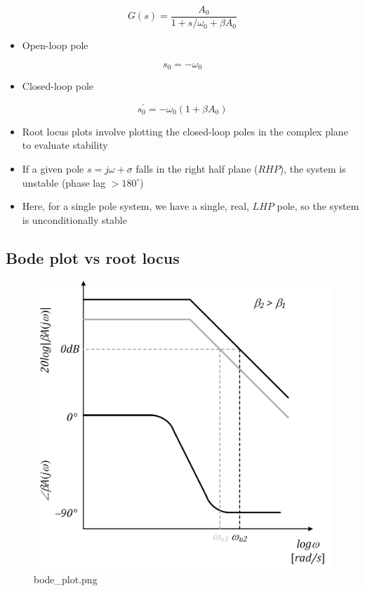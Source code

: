 \documentclass[11pt]{article}
\providecommand{\tightlist}{%
      \setlength{\itemsep}{0pt}\setlength{\parskip}{0pt}}
\begin{document}
\begin{equation}
G(s) = \dfrac{A_0}{1+s/\omega_0 + \beta A_0}
\end{equation}

    \begin{itemize}
\tightlist
\item
  Open-loop pole
\end{itemize}

\begin{equation}
s_0 = -\omega_0
\end{equation}

\begin{itemize}
\tightlist
\item
  Closed-loop pole
\end{itemize}

\begin{equation}
s_0^{'} = -\omega_0(1+\beta A_0)
\end{equation}

    \begin{itemize}
\item
  Root locus plots involve plotting the closed-loop poles in the complex
  plane to evaluate stability
\item
  If a given pole \(s = j\omega + \sigma\) falls in the right half plane
  (\(RHP\)), the system is unstable (phase lag \(> 180^{\circ}\))
\item
  Here, for a single pole system, we have a single, real, \(LHP\) pole,
  so the system is unconditionally stable
\end{itemize}

    \hypertarget{bode-plot-vs-root-locus}{%
\subsection{Bode plot vs root locus}\label{bode-plot-vs-root-locus}}

    \begin{figure}
\centering
\includegraphics{bode_plot.png}
\caption{bode\_plot.png}
\end{figure}
\end{document}
